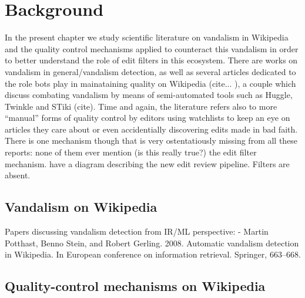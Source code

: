 \chapter{Background}
\label{chap:background}

In the present chapter we study scientific literature on vandalism in Wikipedia and the quality control mechanisms applied to counteract this vandalism in order to better understand the role of edit filters in this ecosystem.
There are works on vandalism in general/vandalism detection, as well as several articles dedicated to the role bots play in mainataining quality on Wikipedia (cite... ), a couple which discuss combating vandalism by means of semi-automated tools such as Huggle, Twinkle and STiki (cite).
Time and again, the literature refers also to more ``manual'' forms of quality control by editors using watchlists to keep an eye on articles they care about or even accidentially discovering edits made in bad faith.
There is one mechanism though that is very ostentatiously missing from all these reports: none of them ever mention (is this really true?) the edit filter mechanism.
\cite{AstHal2018} have a diagram describing the new edit review pipeline. Filters are absent.

\section{Vandalism on Wikipedia}

Papers discussing vandalism detection from IR/ML perspective:
- Martin Potthast, Benno Stein, and Robert Gerling. 2008. Automatic vandalism detection in Wikipedia. In European conference on information retrieval. Springer, 663–668.

\section{Quality-control mechanisms on Wikipedia}


